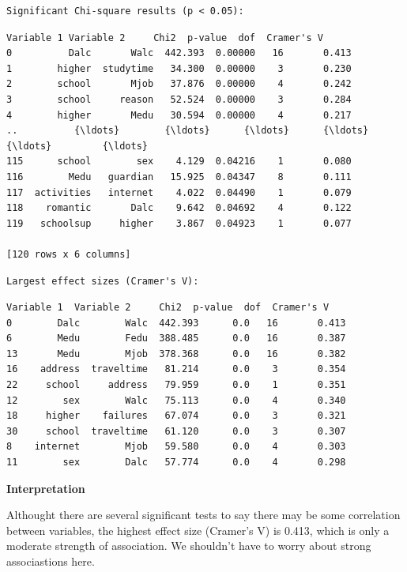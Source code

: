 \documentclass[9pt]{article}
\begin{document}
    \begin{Verbatim}[commandchars=\\\{\}]
Significant Chi-square results (p < 0.05):
    \end{Verbatim}

    
    \begin{Verbatim}[commandchars=\\\{\}]
     Variable 1 Variable 2     Chi2  p-value  dof  Cramer's V
0          Dalc       Walc  442.393  0.00000   16       0.413
1        higher  studytime   34.300  0.00000    3       0.230
2        school       Mjob   37.876  0.00000    4       0.242
3        school     reason   52.524  0.00000    3       0.284
4        higher       Medu   30.594  0.00000    4       0.217
..          {\ldots}        {\ldots}      {\ldots}      {\ldots}  {\ldots}         {\ldots}
115      school        sex    4.129  0.04216    1       0.080
116        Medu   guardian   15.925  0.04347    8       0.111
117  activities   internet    4.022  0.04490    1       0.079
118    romantic       Dalc    9.642  0.04692    4       0.122
119   schoolsup     higher    3.867  0.04923    1       0.077

[120 rows x 6 columns]
    \end{Verbatim}

    
    \begin{Verbatim}[commandchars=\\\{\}]
Largest effect sizes (Cramer's V):
    \end{Verbatim}

    
    \begin{Verbatim}[commandchars=\\\{\}]
   Variable 1  Variable 2     Chi2  p-value  dof  Cramer's V
0        Dalc        Walc  442.393      0.0   16       0.413
6        Medu        Fedu  388.485      0.0   16       0.387
13       Medu        Mjob  378.368      0.0   16       0.382
16    address  traveltime   81.214      0.0    3       0.354
22     school     address   79.959      0.0    1       0.351
12        sex        Walc   75.113      0.0    4       0.340
18     higher    failures   67.074      0.0    3       0.321
30     school  traveltime   61.120      0.0    3       0.307
8    internet        Mjob   59.580      0.0    4       0.303
11        sex        Dalc   57.774      0.0    4       0.298
    \end{Verbatim}

    
    \textbf{Interpretation}

Althought there are several significant tests to say there may be some
correlation between variables, the highest effect size (Cramer's V) is
0.413, which is only a moderate strength of association. We shouldn't
have to worry about strong associastions here.
\end{document}
